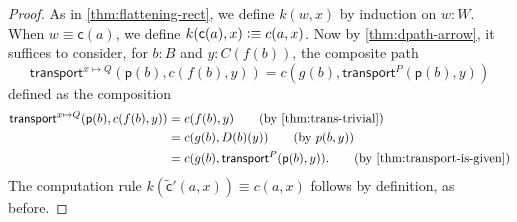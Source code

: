 \documentclass[10pt,a4paper]{article}
\newcommand{\jdeq}{\equiv}      %
\newcommand{\defeq}{\vcentcolon\equiv}  %
\newcommand{\transfib}[3]{\ensuremath{\mathsf{transport}^{#1}(#2,#3)\xspace}}
\newcommand{\cc}{\mathsf{c}}
\newcommand{\pp}{\mathsf{p}}
\newcommand{\cct}{\widetilde{\mathsf{c}}}
\theoremstyle{definition}
\theoremstyle{remark}
\numberwithin{equation}{section}
\begin{document}
\begin{proof}
  As in \cref{thm:flattening-rect}, we define $k(w,x)$ by induction on $w:W$.
  When $w\jdeq \cc(a)$, we define $k(\cc(a),x)\defeq c(a,x)$.
  Now by \cref{thm:dpath-arrow}, it suffices to consider, for $b:B$ and $y:C(f(b))$, the composite path
  \begin{equation}\label{eq:flattening-rectnd}
    \transfib{x\mapsto Q}{\pp(b)}{c(f(b),y)}
    = c(g(b),\transfib{P}{\pp(b)}{y})
  \end{equation}
  defined as the composition
  \begin{align}
    \transfib{x\mapsto Q}{\pp(b)}{c(f(b),y)}
    &= c(f(b),y) \tag{by \cref{thm:trans-trivial}}\\
    &= c(g(b),D(b)(y)) \tag{by $p(b,y)$}\\
    &= c(g(b),\transfib{P}{\pp(b)}{y}). \tag{by \cref{thm:transport-is-given}}
  \end{align}
  The computation rule $k(\cct'(a,x)) \jdeq c(a,x)$ follows by definition, as before.
\end{proof}
\end{document}
